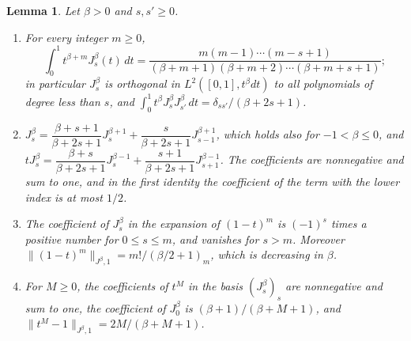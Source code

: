 \documentclass[11pt]{amsart}
\newtheorem{lemma}[theorem]{Lemma}
\theoremstyle{definition}
\theoremstyle{remark}
\numberwithin{equation}{section}
\newcommand{\nrm}[1]{\lVert #1\rVert}
\begin{document}
\begin{lemma}\label{r3:lem-jacobi}
Let $\beta>0$ and $s,s'\geq0$.
\begin{enumerate}[label=\textup{(\alph*)}]
\item For every integer $m\geq0$,
\[
\int_0^1t^{\beta+m}J^\beta_s(t)\,dt=\frac{m(m-1)\cdots(m-s+1)}{(\beta+m+1)(\beta+m+2)\cdots(\beta+m+s+1)} ;
\]
in particular $J^\beta_s$ is orthogonal in $L^2([0,1],t^\beta dt)$ to all polynomials of degree less than $s$, and $\int_0^1t^\beta J^\beta_sJ^\beta_{s'}\,dt=\delta_{ss'}/(\beta+2s+1)$.
\item $J^\beta_s=\dfrac{\beta+s+1}{\beta+2s+1}J^{\beta+1}_s+\dfrac{s}{\beta+2s+1}J^{\beta+1}_{s-1}$, which holds also for $-1<\beta\leq0$, and $tJ^\beta_s=\dfrac{\beta+s}{\beta+2s+1}J^{\beta-1}_s+\dfrac{s+1}{\beta+2s+1}J^{\beta-1}_{s+1}$. The coefficients are nonnegative and sum to one, and in the first identity the coefficient of the term with the lower index is at most $1/2$.
\item The coefficient of $J^\beta_s$ in the expansion of $(1-t)^m$ is $(-1)^s$ times a positive number for $0\leq s\leq m$, and vanishes for $s>m$. Moreover $\nrm{(1-t)^m}_{J^\beta,1}=m!/(\beta/2+1)_m$, which is decreasing in $\beta$.
\item For $M\geq0$, the coefficients of $t^M$ in the basis $(J^\beta_s)_s$ are nonnegative and sum to one, the coefficient of $J^\beta_0$ is $(\beta+1)/(\beta+M+1)$, and $\nrm{t^M-1}_{J^\beta,1}=2M/(\beta+M+1)$.
\end{enumerate}
\end{lemma}
\end{document}
